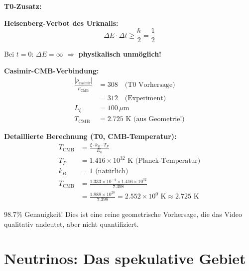 \documentclass[12pt,a4paper]{article}
\newcommand{\xipar}{\xi}
\begin{document}
	\begin{vorteil}
		\textbf{T0-Zusatz:}
		
		\textbf{Heisenberg-Verbot des Urknalls:}
		\begin{equation}
			\Delta E \cdot \Delta t \geq \frac{\hbar}{2} = \frac{1}{2}
		\end{equation}
		
		Bei $t = 0$: $\Delta E = \infty$ $\Rightarrow$ \textbf{physikalisch unmöglich!}
		
		\textbf{Casimir-CMB-Verbindung:}
		\begin{align}
			\frac{|\rho_{\text{Casimir}}|}{\rho_{\text{CMB}}} &= 308 \quad \text{(T0 Vorhersage)} \\
			&= 312 \quad \text{(Experiment)} \\
			L_\xi &= 100 \, \mu\text{m} \\
			T_{\text{CMB}} &= 2.725 \text{ K (aus Geometrie!)}
		\end{align}
		
		\textbf{Detaillierte Berechnung (T0, CMB-Temperatur):}
		\begin{align}
			T_{\text{CMB}} &= \frac{\xipar \cdot k_B \cdot T_P}{E_0} \\
			T_P &= 1.416 \times 10^{32} \text{ K (Planck-Temperatur)} \\
			k_B &= 1 \text{ (natürlich)} \\
			T_{\text{CMB}} &= \frac{1.333 \times 10^{-4} \times 1.416 \times 10^{32}}{7.398} \\
			&= \frac{1.888 \times 10^{28}}{7.398} = 2.552 \times 10^0 \text{ K} \approx 2.725 \text{ K}
		\end{align}
		
		98.7\% Genauigkeit! Dies ist eine reine geometrische Vorhersage, die das Video qualitativ andeutet, aber nicht quantifiziert.
	\end{vorteil}
	
	\section{Neutrinos: Das spekulative Gebiet}
	
\end{document}
